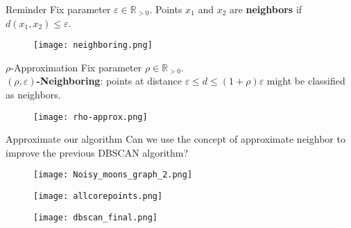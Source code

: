 \documentclass[aspectratio=169]{beamer}
\renewcommand{\epsilon}{\varepsilon}
\begin{document}
\begin{frame}{Reminder}
   \centering Fix parameter $\epsilon\in\mathbb{R}_{>0}$. Points $x_1$ and $x_2$ are \textbf{neighbors} if $d(x_1, x_2) \le \epsilon$.

    \vspace{0.5cm}
    
    \begin{figure}
        \centering
        \texttt{[image: neighboring.png]}
    \end{figure}
    
\end{frame}

\begin{frame}{$\rho$-Approximation}
    Fix parameter $\rho\in\mathbb{R}_{>0}$. \\
    \textbf{$(\rho,\epsilon)$-Neighboring}: points at distance $\epsilon\le d\le (1+\rho)\epsilon$ might be classified as neighbors.

    \begin{figure}
        \centering
        \texttt{[image: rho-approx.png]}
    \end{figure}

    
\end{frame}


\begin{frame}{Approximate our algorithm}
    Can we use the concept of approximate neighbor to improve the previous DBSCAN algorithm?\\

    \vspace{0.5cm}

    \begin{minipage}{0.32 \textwidth}
        \begin{figure}
            \centering
            \texttt{[image: Noisy\_moons\_graph\_2.png]}
        \end{figure}
    \end{minipage}
    \hfill
    \begin{minipage}{0.32 \textwidth}
        \begin{figure}
            \centering
            \texttt{[image: allcorepoints.png]}
        \end{figure}
    \end{minipage}
    \hfill
    \begin{minipage}{0.32 \textwidth}
        \begin{figure}
            \centering
            \texttt{[image: dbscan\_final.png]}
        \end{figure}
    \end{minipage}
    
\end{frame}
\end{document}
